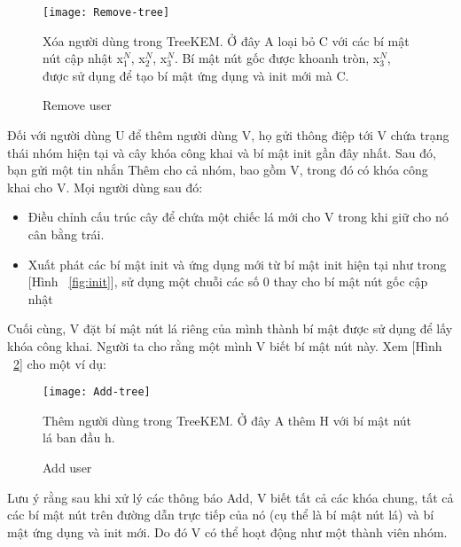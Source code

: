 \documentclass[../main-report.tex]{subfiles}
\begin{document}
\begin{figure}[!h]
\begin{center}
\label{fig:Remove-tree}
\texttt{[image: Remove-tree]}
\caption{Remove user}
{Xóa người dùng trong TreeKEM. Ở đây A loại bỏ C với các bí mật nút cập nhật x$_{1}^{N}$, x$_{2}^{N}$, x$_{3}^{N}$. Bí mật nút gốc được khoanh tròn, x$_{3}^{N}$, được sử dụng để tạo bí mật ứng dụng và init mới mà C.}
\end{center}
\end{figure}

Đối với người dùng U để thêm người dùng V, họ gửi thông điệp tới V chứa trạng thái nhóm hiện tại và cây khóa công khai và bí mật init gần đây nhất. Sau đó, bạn gửi một tin nhắn Thêm cho cả nhóm, bao gồm V, trong đó có khóa công khai cho V. Mọi người dùng sau đó:

\begin{itemize}
	\item{Điều chỉnh cấu trúc cây để chứa một chiếc lá mới cho V trong khi giữ cho nó cân bằng trái.}
	\item{Xuất phát các bí mật init và ứng dụng mới từ bí mật init hiện tại như trong [Hình ~\ref{fig:init}], sử dụng một chuỗi các số 0 thay cho bí mật nút gốc cập nhật}
\end{itemize}

Cuối cùng, V đặt bí mật nút lá riêng của mình thành bí mật được sử dụng để lấy khóa công khai. Người ta cho rằng một mình V biết bí mật nút này. Xem [Hình ~\ref{fig:Add-tree}] cho một ví dụ:

\begin{figure}[!h]
\begin{center}
\label{fig:Add-tree}
\texttt{[image: Add-tree]}
\caption{Add user}
{Thêm người dùng trong TreeKEM. Ở đây A thêm H với bí mật nút lá ban đầu h.}
\end{center}
\end{figure}

Lưu ý rằng sau khi xử lý các thông báo \acrshort{Add}, V biết tất cả các khóa chung, tất cả các bí mật nút trên đường dẫn trực tiếp của nó (cụ thể là bí mật nút lá) và bí mật ứng dụng và init mới. Do đó V có thể hoạt động như một thành viên nhóm.
\end{document}
